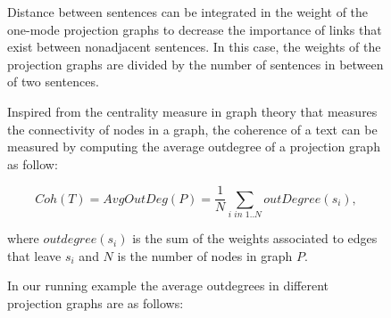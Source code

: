 \begin{figure}[!t]
           




Distance between sentences can be integrated in the weight of the one-mode projection graphs to decrease the importance of links that exist between nonadjacent sentences. 
In this case, the weights of the projection graphs are divided by the number of sentences in between of two sentences. 

Inspired from the centrality measure in graph theory that measures the connectivity of nodes in a graph, the coherence of a text can be measured by computing the average outdegree of a projection graph as follow:

\begin{equation}
Coh(T) = AvgOutDeg(P) = \frac{1}{N} \sum_{\textit{i \ in 1..N}} outDegree(s_i),
\end{equation}

where $outdegree(s_i)$ is the sum of the weights associated to edges that leave $s_i$ and $N$ is the number of nodes in graph $P$. 

In our running example the average outdegrees in different projection graphs are as follows:



\end{figure}
